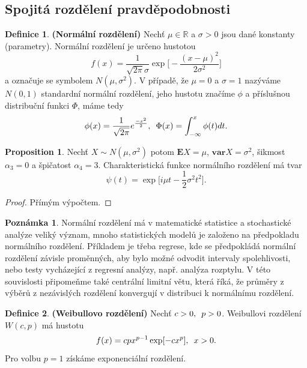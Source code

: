 \documentclass[a4]{report}
\theoremstyle{definition}
\newtheorem{definition}{Definice}[section]
\newtheorem{remark}{Poznámka}[section]
\newtheorem{proposition}{Proposition}[section]
\begin{document}
{\subsection{Spojitá rozdělení pravděpodobnosti}
\begin{definition}{\textbf{(Normální rozdělení)}}
Nechť $ \mu \in \mathbb{R}$ a $\sigma > 0$ jsou dané konstanty (parametry). Normální rozdělení je určeno hustotou
\begin{equation}
f(x) = \frac{1}{\sqrt{2\pi}\sigma}\exp \bigg[ -\frac{(x - \mu)^{2}}{2\sigma^{2}} \bigg]
\end{equation}
a označuje se symbolem $N(\mu, \sigma^{2}).$ V případě, že $\mu = 0$ a $\sigma = 1$ nazýváme $N(0, 1)$ standardní normální rozdělení, jeho hustotu značíme $\phi$ a příslušnou distribuční funkci $\Phi$, máme tedy
\begin{equation}
\phi(x) = \frac{1}{\sqrt{2\pi}}e^{\frac{-x^{2}}{2}}, \enskip \Phi(x) = \int_{-\infty}^{x}\phi(t)dt.
\end{equation}
\end{definition}

\begin{proposition}
Nechť $X \sim N(\mu, \sigma^{2})$ potom $\mathbf{E}X = \mu$, $\mathbf{var}X = \sigma^{2}$, šikmost $\alpha_{3} = 0$ a špičatost $\alpha_{4} = 3$. Charakteristická funkce normálního rozdělení má tvar 
\begin{equation}
\psi(t) = \exp\bigg[ i\mu t - \frac{1}{2}\sigma^{2}t^{2} \bigg].
\end{equation}
\end{proposition}
\begin{proof}
Přímým výpočtem.
\end{proof}

\begin{remark}
Normální rozdělení má v matematické statistice a stochastické analýze veliký význam, mnoho statistických modelů je založeno na předpokladu normálního rozdělení. Příkladem je třeba regrese, kde se předpokládá normální rozdělení závisle proměnných, aby bylo možné odvodit intervaly spolehlivosti, nebo testy vycházející z regresní analýzy, např. analýza rozptylu. V této souvislosti připomeňme také centrální limitní větu, která říká, že průměry z výběrů z nezávislých rozdělení konvergují v distribuci k normálnímu rozdělení.
\end{remark}

\begin{definition}{\textbf{(Weibullovo rozdělení)}}
Nechť $c > 0, \enskip p > 0$. Weibullovi rozdělení $W(c, p)$ má hustotu
\begin{equation}
f(x) = cpx^{p-1}\exp[-cx^{p}], \enskip x > 0.
\end{equation}
Pro volbu $p = 1$ získáme exponenciální rozdělení.
\end{definition}

}
\end{document}
